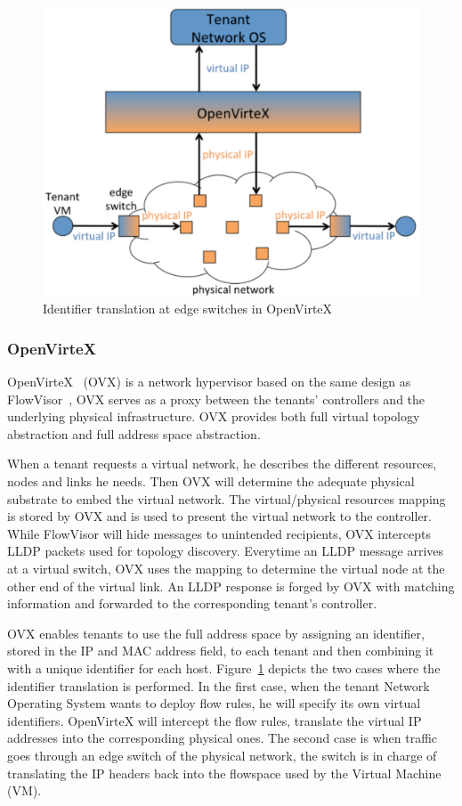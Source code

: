 \begin{figure}[ht]
    \centering
    \includegraphics[scale=0.7]{figures/openvirtex.pdf}
    \caption{Identifier translation at edge switches in OpenVirteX~\cite{OpenVirteX-Al-Shabibi2014}}
    \label{fig:openvirtex}
\end{figure}

\subsubsection{OpenVirteX}
OpenVirteX~\cite{OpenVirteX-Al-Shabibi2014} (OVX) is a network hypervisor based on the same design as FlowVisor~\cite{FlowVisor-Sherwood2009}, \ie OVX serves as a proxy between the tenants' controllers and the underlying physical infrastructure. OVX provides both full virtual topology abstraction and full address space abstraction. 

When a tenant requests a virtual network, he describes the different resources, nodes and links he needs.
Then OVX will determine the adequate physical substrate to embed the virtual network.
The virtual/physical resources mapping is stored by OVX and is used to present the virtual network to the controller.
While FlowVisor will hide messages to unintended recipients, OVX intercepts LLDP packets used for topology discovery. Everytime an LLDP message arrives at a virtual switch, OVX uses the mapping to determine the virtual node at the other end of the virtual link. An LLDP response is forged by OVX with matching information and forwarded to the corresponding tenant's controller.

OVX enables tenants to use the full address space by assigning an identifier, stored in the IP and MAC address field, to each tenant and then combining it with a unique identifier for each host. Figure~\ref{fig:openvirtex} depicts the two cases where the identifier translation is performed. In the first case, when the tenant Network Operating System wants to deploy flow rules, he will specify its own virtual identifiers. OpenVirteX will intercept the flow rules, translate the virtual IP addresses into the corresponding physical ones. The second case is when traffic goes through an edge switch of the physical network, the switch is in charge of translating the IP headers back into the flowspace used by the Virtual Machine (VM).

